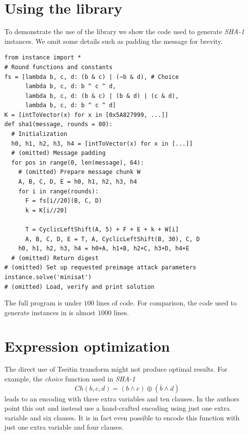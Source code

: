 \documentclass[myposter,portrait]{sciposter}
\def\mysection#1{
{\color{sectionCol}\section*{\sc\bfseries #1}}}
\begin{document}
\begin{multicols*}{3}
\mysection{Using the library}
To demonstrate the use of the library we show the code used to generate \emph{SHA-1} instances.
We omit some details such as padding the message for brevity.
\begin{verbatim}
from instance import *
# Round functions and constants
fs = [lambda b, c, d: (b & c) | (~b & d), # Choice
      lambda b, c, d: b ^ c ^ d,
      lambda b, c, d: (b & c) | (b & d) | (c & d),
      lambda b, c, d: b ^ c ^ d]
K = [intToVector(x) for x in [0x5A827999, ...]]
def sha1(message, rounds = 80):
  # Initialization
  h0, h1, h2, h3, h4 = [intToVector(x) for x in [...]]
  # (omitted) Message padding
  for pos in range(0, len(message), 64):
    # (omitted) Prepare message chunk W
    A, B, C, D, E = h0, h1, h2, h3, h4
    for i in range(rounds):
      F = fs[i//20](B, C, D)
      k = K[i//20]
      
      T = CyclicLeftShift(A, 5) + F + E + k + W[i]
      A, B, C, D, E = T, A, CyclicLeftShift(B, 30), C, D
    h0, h1, h2, h3, h4 = h0+A, h1+B, h2+C, h3+D, h4+E
  # (omitted) Return digest
# (omitted) Set up requested preimage attack parameters
instance.solve('minisat')
# (omitted) Load, verify and print solution
\end{verbatim}
The full program is under $100$ lines of code.
For comparison, the code used to generate instances in \cite{nossum2012sat} is almost $1000$ lines.


\columnbreak
\mysection{Expression optimization}
The direct use of Tseitin transform might not produce optimal results.
For example, the \emph{choice} function used in \emph{SHA-1}
\[
Ch(b, c, d) = (b \land c) \oplus (\overline{b} \land d)
\]
leads to an encoding with three extra variables and ten clauses.
In \cite{nossum2012sat} the authors point this out and instead use a hand-crafted encoding using just one extra variable and six clauses.
It is in fact even possible to encode this function with just one extra variable and four clauses.
~\\


\end{multicols*}
\end{document}
